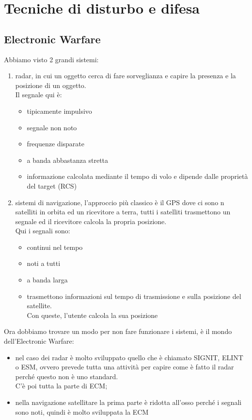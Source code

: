 \documentclass[oneside, 12pt]{extbook}
\begin{document}
\chapter{Tecniche di disturbo e difesa}

\section{Electronic Warfare}
Abbiamo visto 2 grandi sistemi:
\begin{enumerate}
	\item radar, in cui un oggetto cerca di fare sorveglianza e capire la presenza e la posizione di un oggetto.\\
	Il segnale qui è:
	\begin{itemize}
		\item tipicamente impulsivo
		\item segnale non noto
		\item frequenze disparate
		\item a banda abbastanza stretta
		\item informazione calcolata mediante il tempo di volo e dipende dalle proprietà del target (RCS)
	\end{itemize}
	\item sistemi di navigazione, l'approccio più classico è il GPS dove ci sono n satelliti in orbita ed un ricevitore a terra, tutti i satelliti trasmettono un segnale ed il ricevitore calcola la propria posizione.\\
	Qui i segnali sono:
	\begin{itemize}
		\item continui nel tempo
		\item noti a tutti
		\item a banda larga
		\item trasmettono informazioni sul tempo di trasmissione e sulla posizione del satellite.\\
		Con queste, l'utente calcola la sua posizione
	\end{itemize}
\end{enumerate}
Ora dobbiamo trovare un modo per non fare funzionare i sistemi, è il mondo dell'Electronic Warfare:
\begin{itemize}
	\item nel caso dei radar è molto sviluppato quello che è chiamato SIGNIT, ELINT o ESM, ovvero prevede tutta una attività per capire come è fatto il radar perché questo non è uno standard.\\
	C'è  poi tutta la parte di ECM;
	\item nella navigazione satellitare la prima parte è ridotta all'osso perché i segnali sono noti, quindi è molto sviluppata la ECM
\end{itemize}
\end{document}
